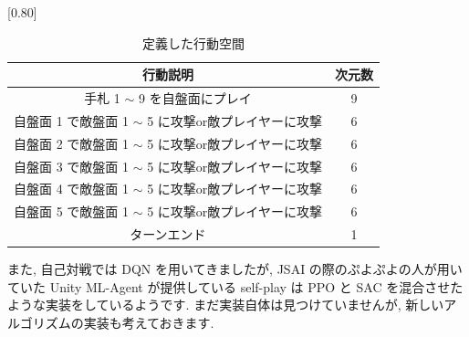\documentclass{jarticle}     %
\begin{document}
  \begin{table}[t]
    \centering
    \caption{定義した行動空間}
    \vspace{-0.3cm}
    \label{table:action}
    \scalebox{0.80}[0.80]{
      \begin{tabular}{|c|c|}
        \hline
        行動説明                          & 次元数        \\ \hline \hline
        手札 1 $\sim$ 9 を自盤面にプレイ             & 9          \\ \hline
        自盤面 1 で敵盤面 1 $\sim$ 5 に攻撃or敵プレイヤーに攻撃    & 6          \\ \hline
        自盤面 2 で敵盤面 1 $\sim$ 5 に攻撃or敵プレイヤーに攻撃    & 6          \\ \hline
        自盤面 3 で敵盤面 1 $\sim$ 5 に攻撃or敵プレイヤーに攻撃    & 6          \\ \hline
        自盤面 4 で敵盤面 1 $\sim$ 5 に攻撃or敵プレイヤーに攻撃    & 6          \\ \hline
        自盤面 5 で敵盤面 1 $\sim$ 5 に攻撃or敵プレイヤーに攻撃    & 6          \\ \hline
        ターンエンド & 1 \\ \hline
        \end{tabular}
    }
      \end{table}
  
      \par
    また, 自己対戦では DQN を用いてきましたが, JSAI の際のぷよぷよの人が用いていた Unity ML-Agent が提供している self-play は PPO と SAC を混合させたような実装をしているようです.\cite{self} 
    まだ実装自体は見つけていませんが, 新しいアルゴリズムの実装も考えておきます.




\end{document}
